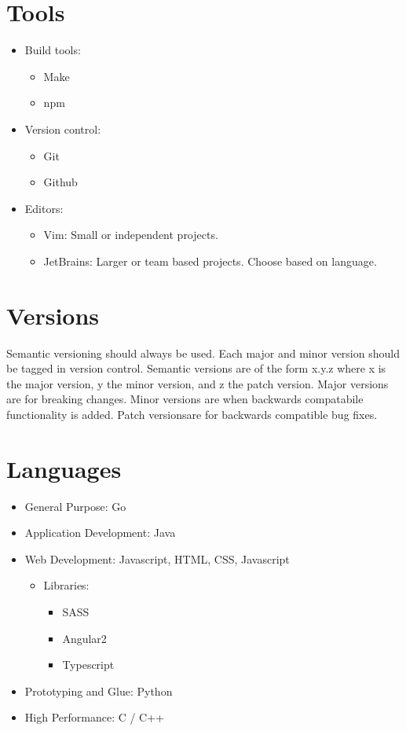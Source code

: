 \documentclass{article}
\begin{document}
\section{Tools}

\begin{itemize}
	\item Build tools: \begin{itemize}
		\item Make
		\item npm
	\end{itemize}
	\item Version control: \begin{itemize}
		\item Git
		\item Github
	\end{itemize}
	\item Editors: \begin{itemize}
		\item Vim: Small or independent projects.
		\item JetBrains: Larger or team based projects. Choose
			based on language.
	\end{itemize}
\end{itemize}

\section{Versions}

Semantic versioning should always be used. Each major and minor version should
be tagged in version control. Semantic versions are of the form x.y.z where x is
the major version, y the minor version, and z the patch version. Major versions
are for breaking changes. Minor versions are when backwards compatabile
functionality is added. Patch versionsare for backwards compatible bug fixes.

\section{Languages}

\begin{itemize}
	\item General Purpose: Go
	\item Application Development: Java
	\item Web Development: Javascript, HTML, CSS, Javascript
		\begin{itemize}
		\item Libraries: \begin{itemize}
			\item SASS
			\item Angular2
			\item Typescript
		\end{itemize}
		\end{itemize}
	\item Prototyping and Glue: Python
	\item High Performance: C / C++
\end{itemize}
\end{document}
